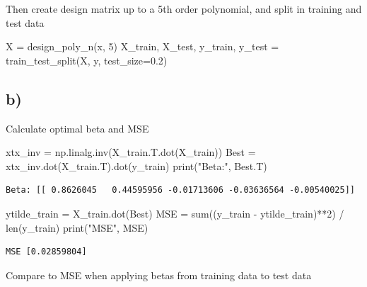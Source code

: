 \documentclass[
  letterpaper,
  DIV=11,
  numbers=noendperiod]{scrartcl}
\newenvironment{Shaded}{\begin{snugshade}}{\end{snugshade}}
\newcommand{\BuiltInTok}[1]{\textcolor[rgb]{0.00,0.23,0.31}{#1}}
\newcommand{\DecValTok}[1]{\textcolor[rgb]{0.68,0.00,0.00}{#1}}
\newcommand{\FloatTok}[1]{\textcolor[rgb]{0.68,0.00,0.00}{#1}}
\newcommand{\NormalTok}[1]{\textcolor[rgb]{0.00,0.23,0.31}{#1}}
\newcommand{\OperatorTok}[1]{\textcolor[rgb]{0.37,0.37,0.37}{#1}}
\newcommand{\StringTok}[1]{\textcolor[rgb]{0.13,0.47,0.30}{#1}}
\begin{document}
Then create design matrix up to a 5th order polynomial, and split in
training and test data

\begin{Shaded}
\begin{Highlighting}[]
\NormalTok{X }\OperatorTok{=}\NormalTok{ design\_poly\_n(x, }\DecValTok{5}\NormalTok{)}
\NormalTok{X\_train, X\_test, y\_train, y\_test }\OperatorTok{=}\NormalTok{ train\_test\_split(X, y, test\_size}\OperatorTok{=}\FloatTok{0.2}\NormalTok{)}
\end{Highlighting}
\end{Shaded}

\hypertarget{b}{%
\subsection{b)}\label{b}}

Calculate optimal beta and MSE

\begin{Shaded}
\begin{Highlighting}[]
\NormalTok{xtx\_inv }\OperatorTok{=}\NormalTok{ np.linalg.inv(X\_train.T.dot(X\_train))}
\NormalTok{Best }\OperatorTok{=}\NormalTok{ xtx\_inv.dot(X\_train.T).dot(y\_train)}
\BuiltInTok{print}\NormalTok{(}\StringTok{"Beta:"}\NormalTok{, Best.T)}
\end{Highlighting}
\end{Shaded}

\begin{verbatim}
Beta: [[ 0.8626045   0.44595956 -0.01713606 -0.03636564 -0.00540025]]
\end{verbatim}

\begin{Shaded}
\begin{Highlighting}[]
\NormalTok{ytilde\_train }\OperatorTok{=}\NormalTok{ X\_train.dot(Best)}
\NormalTok{MSE }\OperatorTok{=} \BuiltInTok{sum}\NormalTok{((y\_train }\OperatorTok{{-}}\NormalTok{ ytilde\_train)}\OperatorTok{**}\DecValTok{2}\NormalTok{) }\OperatorTok{/} \BuiltInTok{len}\NormalTok{(y\_train)}
\BuiltInTok{print}\NormalTok{(}\StringTok{"MSE"}\NormalTok{, MSE)}
\end{Highlighting}
\end{Shaded}

\begin{verbatim}
MSE [0.02859804]
\end{verbatim}

Compare to MSE when applying betas from training data to test data
\end{document}
